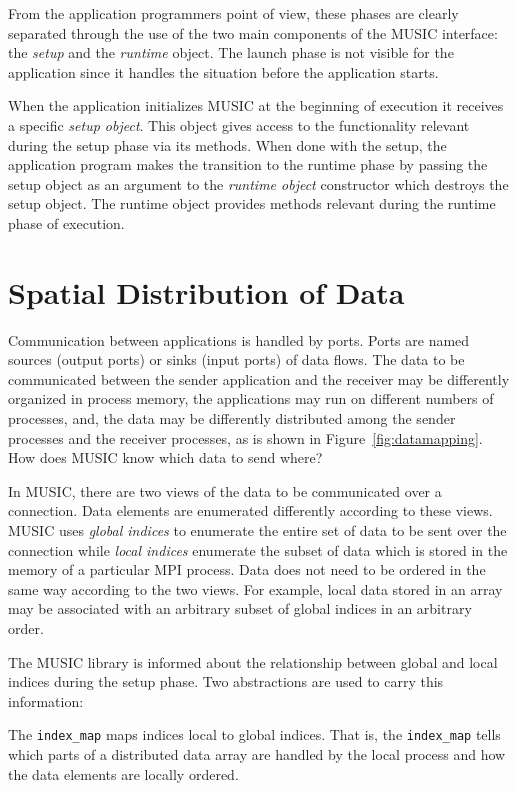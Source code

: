 \documentclass[a4paper]{report}
\begin{document}
From the application programmers point of view, these phases are
clearly separated through the use of the two main components of the
MUSIC interface: the \emph{setup} and the \emph{runtime} object.  The
launch phase is not visible for the application since it handles the
situation before the application starts.

When the application initializes MUSIC at the beginning of execution
it receives a specific \emph{setup object}.  This object gives access
to the functionality relevant during the setup phase via its methods.
When done with the setup, the application program makes the transition
to the runtime phase by passing the setup object as an argument to the
\emph{runtime object} constructor which destroys the setup object.
The runtime object provides methods relevant during the runtime phase
of execution.

\section{Spatial Distribution of Data}

Communication between applications is handled by ports.  Ports are
named sources (output ports) or sinks (input ports) of data flows.
The data to be communicated between the sender application and the
receiver may be differently organized in process memory, the
applications may run on different numbers of processes, and, the data
may be differently distributed among the sender processes and the
receiver processes, as is shown in Figure~\ref{fig:datamapping}.  How
does MUSIC know which data to send where?

In MUSIC, there are two views of the data to be communicated over a
connection.  Data elements are enumerated differently according to
these views.  MUSIC uses \emph{global indices} to
enumerate the entire set of data to be sent over the connection while
\emph{local indices} enumerate the subset of data
which is stored in the memory of a particular MPI process.  Data does
not need to be ordered in the same way according to the two views.
For example, local data stored in an array may be associated with an
arbitrary subset of global indices in an arbitrary order.

The MUSIC library is informed about the relationship between global
and local indices during the setup phase.  Two abstractions are used
to carry this information:

The \lstinline|index_map| maps indices local to global indices.  That
is, the \lstinline|index_map| tells which parts of a distributed data
array are handled by the local process and how the data elements are
locally ordered.
\end{document}
